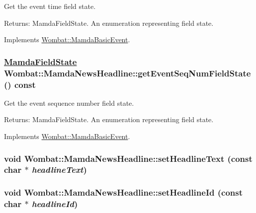 Get the event time field state. 

\begin{Desc}
\item[Returns:]Mamda\-Field\-State. An enumeration representing field state. \end{Desc}


Implements \hyperlink{classWombat_1_1MamdaBasicEvent_ff3932065e16e660fb6cd9285b46f7d0}{Wombat::Mamda\-Basic\-Event}.\hypertarget{classWombat_1_1MamdaNewsHeadline_b1c8d44cfd952aa946279968591b3113}{
\subsubsection[getEventSeqNumFieldState]{\setlength{\rightskip}{0pt plus 5cm}\hyperlink{namespaceWombat_93aac974f2ab713554fd12a1fa3b7d2a}{Mamda\-Field\-State} Wombat::Mamda\-News\-Headline::get\-Event\-Seq\-Num\-Field\-State () const}}
\label{classWombat_1_1MamdaNewsHeadline_b1c8d44cfd952aa946279968591b3113}


Get the event sequence number field state. 

\begin{Desc}
\item[Returns:]Mamda\-Field\-State. An enumeration representing field state. \end{Desc}


Implements \hyperlink{classWombat_1_1MamdaBasicEvent_51cc0b9d4c2b8a982ccd18b339707cb5}{Wombat::Mamda\-Basic\-Event}.\hypertarget{classWombat_1_1MamdaNewsHeadline_e9ed0ca22678a7c555027f7b16c5c060}{
\subsubsection[setHeadlineText]{\setlength{\rightskip}{0pt plus 5cm}void Wombat::Mamda\-News\-Headline::set\-Headline\-Text (const char $\ast$ {\em headline\-Text})}}
\label{classWombat_1_1MamdaNewsHeadline_e9ed0ca22678a7c555027f7b16c5c060}


\hypertarget{classWombat_1_1MamdaNewsHeadline_b0c2bc4354f0d68aba4eba1fc173f635}{
\subsubsection[setHeadlineId]{\setlength{\rightskip}{0pt plus 5cm}void Wombat::Mamda\-News\-Headline::set\-Headline\-Id (const char $\ast$ {\em headline\-Id})}}
\label{classWombat_1_1MamdaNewsHeadline_b0c2bc4354f0d68aba4eba1fc173f635}


